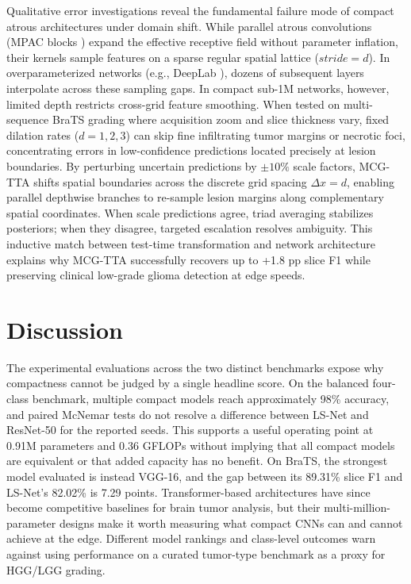 ﻿\documentclass[journal]{IEEEtran}
\begin{document}
Qualitative error investigations reveal the fundamental failure mode of compact atrous architectures under domain shift. While parallel atrous convolutions (MPAC blocks \cite{21}) expand the effective receptive field without parameter inflation, their kernels sample features on a sparse regular spatial lattice ($stride = d$). In overparameterized networks (e.g., DeepLab \cite{5}), dozens of subsequent layers interpolate across these sampling gaps. In compact sub-1M networks, however, limited depth restricts cross-grid feature smoothing. When tested on multi-sequence BraTS grading where acquisition zoom and slice thickness vary, fixed dilation rates ($d=1, 2, 3$) can skip fine infiltrating tumor margins or necrotic foci, concentrating errors in low-confidence predictions located precisely at lesion boundaries. By perturbing uncertain predictions by $\pm 10\%$ scale factors, MCG-TTA shifts spatial boundaries across the discrete grid spacing $\Delta x = d$, enabling parallel depthwise branches to re-sample lesion margins along complementary spatial coordinates. When scale predictions agree, triad averaging stabilizes posteriors; when they disagree, targeted escalation resolves ambiguity. This inductive match between test-time transformation and network architecture explains why MCG-TTA successfully recovers up to +1.8 pp slice F1 while preserving clinical low-grade glioma detection at edge speeds.


\section{Discussion}

The experimental evaluations across the two distinct benchmarks expose why compactness cannot be judged by a single headline score. On the balanced four-class benchmark, multiple compact models reach approximately 98\% accuracy, and paired McNemar tests do not resolve a difference between LS-Net and ResNet-50 for the reported seeds. This supports a useful operating point at 0.91M parameters and 0.36 GFLOPs without implying that all compact models are equivalent or that added capacity has no benefit. On BraTS, the strongest model evaluated is instead VGG-16, and the gap between its 89.31\% slice F1 and LS-Net's 82.02\% is 7.29 points. Transformer-based architectures have since become competitive baselines for brain tumor analysis, but their multi-million-parameter designs make it worth measuring what compact CNNs can and cannot achieve at the edge. Different model rankings and class-level outcomes warn against using performance on a curated tumor-type benchmark as a proxy for HGG/LGG grading.
\end{document}
